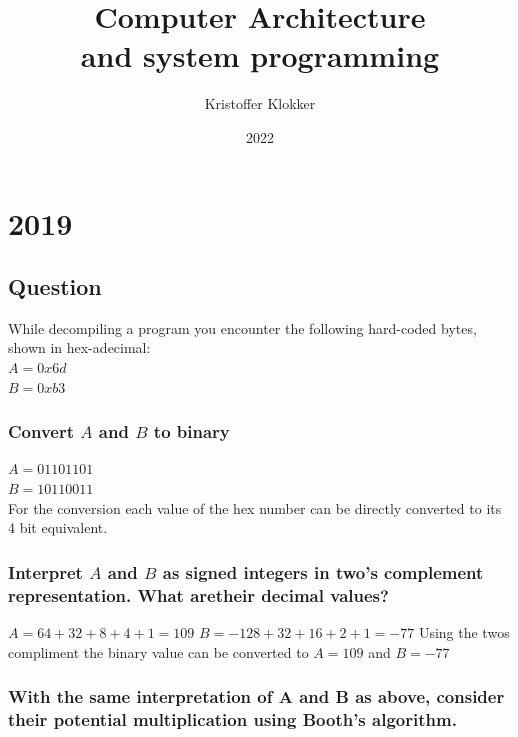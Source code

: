 \documentclass[12pt, a4paper]{article}
\title{Computer Architecture\\and system programming}
\date{2022}
\author{Kristoffer Klokker}
\begin{document}
	\maketitle
	\clearpage
	\tableofcontents
	\clearpage
	\section{2019}
		\subsection{Question}
			While decompiling a program you encounter the following hard-coded bytes, shown in hex-adecimal:\\
			$A=0x6d$\\
			$B=0xb3$
			\subsubsection{Convert $A$ and $B$ to binary}
				$A=0110 1101$\\
				$B=1011 0011$\\
				For the conversion each value of the hex number can be directly converted to its 4 bit equivalent.
			\subsubsection{Interpret $A$ and $B$ as signed integers in two’s complement representation. What aretheir decimal values?}
				$A=64+32+8+4+1=109$
				$B=-128+32+16+2+1=-77$
				Using the twos compliment the binary value can be converted to $A=109$ and $B=-77$
			\subsubsection{With the same interpretation of A and B as above, consider their potential multiplication using Booth’s algorithm.}
\end{document}
